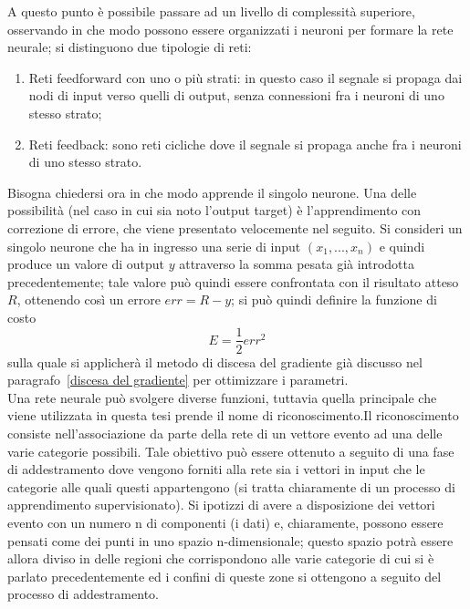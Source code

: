 A questo punto è possibile passare ad un livello di complessità superiore, osservando in che modo possono essere organizzati i neuroni per formare la rete neurale; si distinguono due tipologie di reti:
\begin{enumerate}
	\item Reti feedforward con uno o più strati: in questo caso il segnale si propaga dai nodi di input verso quelli di output, senza connessioni fra i neuroni di uno stesso strato;
	\item Reti feedback: sono reti cicliche dove il segnale si propaga anche fra i neuroni di uno stesso strato.
\end{enumerate}
Bisogna chiedersi ora in che modo apprende il singolo neurone. Una delle possibilità (nel caso in cui sia noto l'output target) è l'apprendimento con correzione di errore, che viene presentato velocemente nel seguito.
Si consideri un singolo neurone che ha in ingresso una serie di input $(x_1,...,x_n)$ e quindi produce un valore di output $y$ attraverso la somma pesata già introdotta precedentemente; tale valore può quindi essere confrontata con il risultato atteso $R$, ottenendo così un errore $err = R - y$; si può quindi definire la funzione di costo
\begin{equation}
E = \frac{1}{2}err^2
\end{equation}
sulla quale si applicherà il metodo di discesa del gradiente già discusso nel paragrafo~\ref{discesa del gradiente} per ottimizzare i parametri.\\
Una rete neurale può svolgere diverse funzioni, tuttavia quella principale che viene utilizzata in questa tesi prende il nome di riconoscimento.Il riconoscimento consiste nell'associazione da parte della rete di un vettore evento ad una delle varie categorie possibili. Tale obiettivo può essere ottenuto a seguito di una fase di addestramento dove vengono forniti alla rete sia i vettori in input che le categorie alle quali questi appartengono (si tratta chiaramente di un processo di apprendimento supervisionato). Si ipotizzi di avere a disposizione dei vettori evento con un numero n di componenti (i dati) e, chiaramente, possono essere pensati come dei punti in uno spazio n-dimensionale; questo spazio potrà essere allora diviso in delle regioni che corrispondono alle varie categorie di cui si è parlato precedentemente ed i confini di queste zone si ottengono a seguito del processo di addestramento. \\
